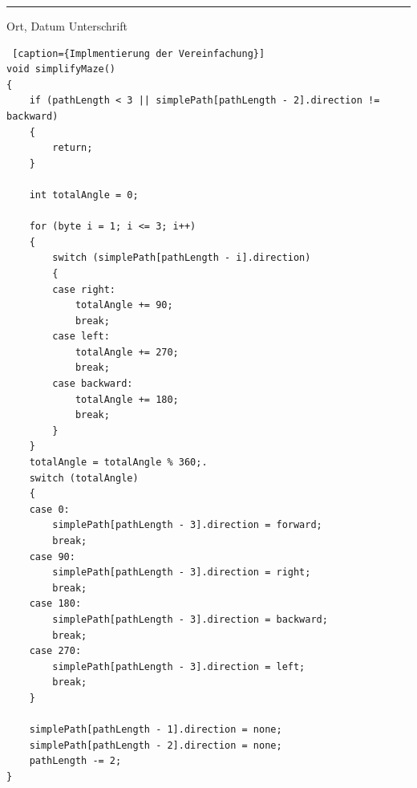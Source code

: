\documentclass[12pt]{article}
\begin{document}
\vspace{4cm}
\rule{\textwidth}{1pt}
\hspace{2cm} Ort, Datum \hfill Unterschrift \hspace{2cm}

\newpage




 





\newpage
\begin{lstlisting} [caption={Implmentierung der Vereinfachung}]
void simplifyMaze()
{
    if (pathLength < 3 || simplePath[pathLength - 2].direction != backward)
    {
        return;
    }

    int totalAngle = 0;

    for (byte i = 1; i <= 3; i++)
    {
        switch (simplePath[pathLength - i].direction)
        {
        case right:
            totalAngle += 90;
            break;
        case left:
            totalAngle += 270;
            break;
        case backward:
            totalAngle += 180;
            break;
        }
    }
    totalAngle = totalAngle % 360;.
    switch (totalAngle)
    {
    case 0:
        simplePath[pathLength - 3].direction = forward;
        break;
    case 90:
        simplePath[pathLength - 3].direction = right;
        break;
    case 180:
        simplePath[pathLength - 3].direction = backward;
        break;
    case 270:
        simplePath[pathLength - 3].direction = left;
        break;
    }

    simplePath[pathLength - 1].direction = none;
    simplePath[pathLength - 2].direction = none;
    pathLength -= 2;
}
\end{lstlisting}
\end{document}
